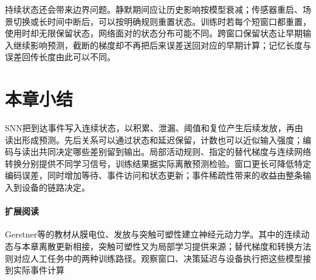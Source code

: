 持续状态还会带来边界问题。静默期间应让历史影响按模型衰减；传感器重启、场景切换或长时间中断后，可以按明确规则重置状态。训练时若每个短窗口都重置，使用时却无限保留状态，网络面对的状态分布可能不同。跨窗口保留状态让早期输入继续影响预测，截断的梯度却不再把后来误差送回对应的早期计算；记忆长度与误差回传长度由此可以不同。

\section{本章小结}
\label{sec:snn-summary}

SNN把到达事件写入连续状态，以积累、泄漏、阈值和复位产生后续发放，再由读出形成预测。先后关系可以通过状态和延迟保留，计数也可以近似输入强度；编码与读出共同决定哪些差别留到输出。局部活动规则、指定的替代梯度与连续网络转换分别提供不同学习信号，训练结果据实际离散预测检验。窗口更长可降低特定编码误差，同时增加等待、事件访问和状态更新；事件稀疏性带来的收益由整条输入到设备的链路决定。

\paragraph{扩展阅读}
Gerstner等的教材从膜电位、发放与突触可塑性建立神经元动力学。其中的连续动态与本章离散更新相接，突触可塑性又为局部学习提供来源；替代梯度和转换方法则对应人工任务中的两种训练路径。观察窗口、决策延迟与设备执行把这些模型接到实际事件计算
